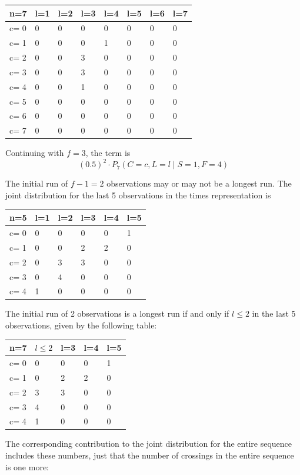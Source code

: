 \begin{tabular}{l | l l l l l l l}
\hline
n=7&l=1&l=2&l=3&l=4&l=5&l=6&l=7\\
\hline
c= 0& 0& 0& 0& 0& 0& 0& 0\\
c= 1& 0& 0& 0& 1& 0& 0& 0\\
c= 2& 0& 0& 3& 0& 0& 0& 0\\
c= 3& 0& 0& 3& 0& 0& 0& 0\\
c= 4& 0& 0& 1& 0& 0& 0& 0\\
c= 5& 0& 0& 0& 0& 0& 0& 0\\
c= 6& 0& 0& 0& 0& 0& 0& 0\\
c= 7& 0& 0& 0& 0& 0& 0& 0\\
\hline
\end{tabular}


Continuing with $f=3$, the term is $$(0.5)^2 \cdot   P_7 (C=c, L=l \mid S=1,F=4)$$

The initial run of $f-1=2$ observations may or may not be a longest run. The joint distribution for the last 5 observations in the times representation is 

\begin{tabular}{l | l l l l l}
\hline
n=5&l=1&l=2&l=3&l=4&l=5\\
\hline
c= 0& 0& 0& 0& 0& 1\\
c= 1& 0& 0& 2& 2& 0\\
c= 2& 0& 3& 3& 0& 0\\
c= 3& 0& 4& 0& 0& 0\\
c= 4& 1& 0& 0& 0& 0\\
\hline
\end{tabular}

The initial run of 2 observations is a longest run if and only if $l \leq 2$ in the last 5 observations, given by the following table:

\begin{tabular}{l | l l l l}
\hline
n=7&$l \leq 2$&l=3&l=4&l=5\\
\hline
c= 0& 0& 0& 0& 1\\
c= 1& 0& 2& 2& 0\\
c= 2& 3& 3& 0& 0\\
c= 3& 4& 0& 0& 0\\
c= 4& 1& 0& 0& 0\\
\hline
\end{tabular}

The corresponding contribution to the joint distribution for the entire sequence includes these numbers, just that the number of crossings in the entire sequence is one more:

